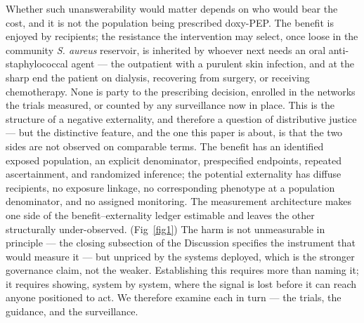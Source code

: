 \documentclass[10pt,letterpaper]{article}
\begin{document}
Whether such unanswerability would matter depends on who would bear the
cost, and it is not the population being prescribed doxy-PEP. The
benefit is enjoyed by recipients; the resistance the intervention may
select, once loose in the community \emph{S. aureus} reservoir, is
inherited by whoever next needs an oral anti-staphylococcal agent ---
the outpatient with a purulent skin infection, and at the sharp end the
patient on dialysis, recovering from surgery, or receiving chemotherapy.
None is party to the prescribing decision, enrolled in the networks the
trials measured, or counted by any surveillance now in place. This is
the structure of a negative externality, and therefore a
question of distributive justice --- but the distinctive
feature, and the one this paper is about, is that the two sides are not
observed on comparable terms. The benefit has an identified exposed
population, an explicit denominator, prespecified endpoints, repeated
ascertainment, and randomized inference; the potential externality has
diffuse recipients, no exposure linkage, no corresponding phenotype at a
population denominator, and no assigned monitoring. The
measurement architecture makes one side of the benefit--externality
ledger estimable and leaves the other structurally under-observed. (Fig~\ref{fig1}) The
harm is not unmeasurable in principle --- the closing subsection of the
Discussion specifies the instrument that would measure it --- but
unpriced by the systems deployed, which is the stronger
governance claim, not the weaker. Establishing this requires more than
naming it; it requires showing, system by system, where the signal is
lost before it can reach anyone positioned to act. We therefore examine
each in turn --- the trials, the guidance, and the surveillance.
\end{document}
